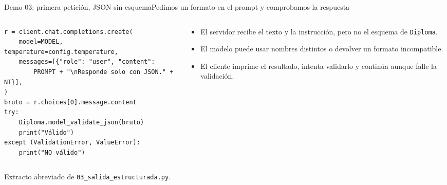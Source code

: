 \begin{frame}[fragile]{Demo 03: primera petición, JSON sin esquema}{Pedimos un formato en el prompt y comprobamos la respuesta}
	\begin{columns}[T]
		\begin{column}{0.58\textwidth}
			\begin{lstlisting}
r = client.chat.completions.create(
    model=MODEL, temperature=config.temperature,
    messages=[{"role": "user", "content":
        PROMPT + "\nResponde solo con JSON." + NT}],
)
bruto = r.choices[0].message.content
try:
    Diploma.model_validate_json(bruto)
    print("Válido")
except (ValidationError, ValueError):
    print("NO válido")
\end{lstlisting}
		\end{column}
		\begin{column}{0.4\textwidth}
			\footnotesize
			\begin{itemize}
				\item El servidor recibe el texto y la instrucción, pero no el esquema de \texttt{Diploma}.
				\item El modelo puede usar nombres distintos o devolver un formato incompatible.
				\item El cliente imprime el resultado, intenta validarlo y continúa aunque falle la validación.
			\end{itemize}
		\end{column}
	\end{columns}
	{\scriptsize Extracto abreviado de \texttt{03\_salida\_estructurada.py}.}
\end{frame}

